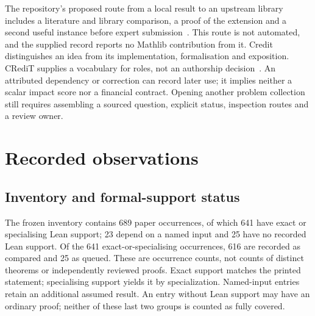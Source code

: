 \documentclass[10pt]{article}
\newcommand{\LedgerRows}{689}
\newcommand{\LedgerNamedInput}{23}
\newcommand{\LedgerNoLean}{25}
\newcommand{\LedgerFormal}{641}
\newcommand{\LedgerCompared}{616}
\newcommand{\LedgerQueued}{25}
\begin{document}
The repository's proposed route from a local result to an upstream library includes a literature and library comparison, a proof of the extension and a second useful instance before expert submission~\cite{mathlibcontrib}.
This route is not automated, and the supplied record reports no Mathlib contribution from it.
Credit distinguishes an idea from its implementation, formalisation and exposition. CRediT supplies a vocabulary for roles, not an authorship decision~\cite{credit}.
An attributed dependency or correction can record later use; it implies neither a scalar impact score nor a financial contract.
Opening another problem collection still requires assembling a sourced question, explicit status, inspection routes and a review owner.

\section{Recorded observations}\label{sec:instance}\label{sec:evaluation}
\subsection{Inventory and formal-support status}
The frozen inventory contains \LedgerRows{} paper occurrences, of which \LedgerFormal{} have exact or specialising Lean support; \LedgerNamedInput{} depend on a named input and \LedgerNoLean{} have no recorded Lean support.
Of the \LedgerFormal{} exact-or-specialising occurrences, \LedgerCompared{} are recorded as compared and \LedgerQueued{} as queued.
These are occurrence counts, not counts of distinct theorems or independently reviewed proofs. Exact support matches the printed statement; specialising support yields it by specialization. Named-input entries retain an additional assumed result. An entry without Lean support may have an ordinary proof; neither of these last two groups is counted as fully covered.
\end{document}
